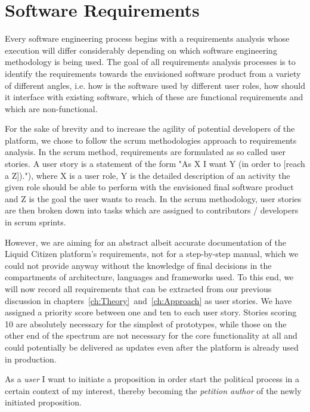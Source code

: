 \section{Software Requirements}
\label{sec:SoftwareRequirements}

Every software engineering process begins with a requirements analysis whose execution will differ considerably depending on which software engineering methodology is being used.
The goal of all requirements analysis processes is to identify the requirements towards the envisioned software product from a variety of different angles, i.e. how is the software used by different user roles, how should it interface with existing software, which of these are functional requirements and which are non-functional.

For the sake of brevity and to increase the agility of potential developers of the platform, we chose to follow the scrum methodologies approach to requirements analysis.
In the scrum method, requirements are formulated as so called user stories.
A user story is a statement of the form "As X I want Y (in order to [reach a Z])."), where X is a user role, Y is the detailed description of an activity the given role should be able to perform with the envisioned final software product and Z is the goal the user wants to reach.
In the scrum methodology, user stories are then broken down into tasks which are assigned to contributors / developers in scrum sprints.

However, we are aiming for an abstract albeit accurate documentation of the Liquid Citizen platform's requirements, not for a step-by-step manual, which we could not provide anyway without the knowledge of final decisions in the compartments of architecture, languages and frameworks used.
To this end, we will now record all requirements that can be extracted from our previous discussion in chapters~\ref{ch:Theory}~and~\ref{ch:Approach} as user stories.
We have assigned a priority score between one and ten to each user story. Stories scoring 10 are absolutely necessary for the simplest of prototypes, while those on the other end of the spectrum are not necessary for the core functionality at all and could potentially be delivered as updates even after the platform is already used in production.

As a \textit{user} I want to initiate a proposition in order start the political process in a certain context of my interest, thereby becoming the \textit{petition author} of the newly initiated proposition.

